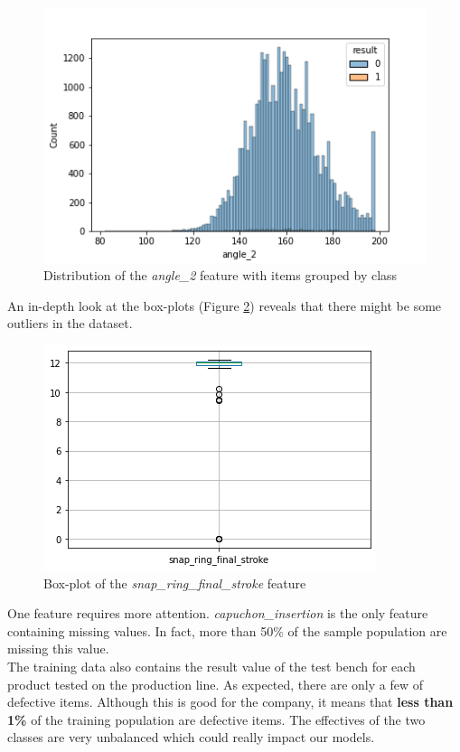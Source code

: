 \begin{figure}
    \center
    \includegraphics[scale=.5]{img/hist_angle_2.png}
    \caption{Distribution of the \textit{angle\_2} feature with items grouped by class}
    \label{hist}
\end{figure}

An in-depth look at the box-plots (Figure \ref{boxplot}) reveals that there might be some outliers in the dataset.\\

\begin{figure}
    \center
    \includegraphics[scale=.5]{img/boxplot_snap_ring_final_stroke.png}
    \caption{Box-plot of the \textit{snap\_ring\_final\_stroke} feature}
    \label{boxplot}
\end{figure}

One feature requires more attention. \textit{capuchon\_insertion} is the only feature containing missing values. In fact, more than 50\% of the sample population are missing this value.\\

The training data also contains the result value of the test bench for each product tested on the production line. As expected, there are only a few of defective items. Although this is good for the company, it means that \textbf{less than 1\%} of the training population are defective items. The effectives of the two classes are very unbalanced which could really impact our models.